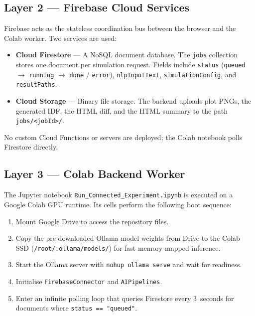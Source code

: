 \documentclass[12pt, a4paper]{article}
\begin{document}
\subsection{Layer 2 --- Firebase Cloud Services}

Firebase acts as the stateless coordination bus between the browser and the Colab worker. Two services are used:

\begin{itemize}[nosep]
  \item \textbf{Cloud Firestore} --- A NoSQL document database. The \texttt{jobs} collection stores one document per simulation request. Fields include \texttt{status} (\texttt{queued} $\to$ \texttt{running} $\to$ \texttt{done} / \texttt{error}), \texttt{nlpInputText}, \texttt{simulationConfig}, and \texttt{resultPaths}.
  \item \textbf{Cloud Storage} --- Binary file storage. The backend uploads plot PNGs, the generated IDF, the HTML diff, and the HTML summary to the path \texttt{jobs/<jobId>/}.
\end{itemize}

No custom Cloud Functions or servers are deployed; the Colab notebook polls Firestore directly.

\subsection{Layer 3 --- Colab Backend Worker}

The Jupyter notebook \texttt{Run\_Connected\_Experiment.ipynb} is executed on a Google Colab GPU runtime. Its cells perform the following boot sequence:

\begin{enumerate}[nosep]
  \item Mount Google Drive to access the repository files.
  \item Copy the pre-downloaded Ollama model weights from Drive to the Colab SSD (\texttt{/root/.ollama/models/}) for fast memory-mapped inference.
  \item Start the Ollama server with \texttt{nohup ollama serve} and wait for readiness.
  \item Initialise \texttt{FirebaseConnector} and \texttt{AIPipelines}.
  \item Enter an infinite polling loop that queries Firestore every 3~seconds for documents where \texttt{status == "queued"}.
\end{enumerate}
\end{document}

